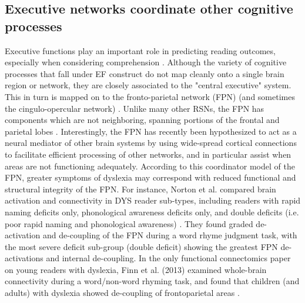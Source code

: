 \subsection{Executive networks coordinate other cognitive processes} 
Executive functions play an important role in predicting reading outcomes, especially when considering comprehension \cite{Cutting2008}. Although the variety of cognitive processes that fall under EF construct do not map cleanly onto a single brain region or network, they are closely associated to the "central executive" system. This in turn is mapped on to the fronto-parietal network (FPN) (and sometimes the cingulo-opercular network) \cite{Fedorenko2013, Cocchi2013}. Unlike many other RSNs, the FPN has components which are not neighboring, spanning portions of the frontal and parietal lobes \cite{Yeo2011}. Interestingly, the FPN has recently been hypothesized to act as a neural mediator of other brain systems \cite{Mennon2010, Cole2014} by using wide-spread cortical connections to facilitate efficient processing of other networks, and in particular assist when areas are not functioning adequately. According to this coordinator model of the FPN, greater symptoms of dyslexia may correspond with reduced functional and structural integrity of the FPN. For instance, Norton et al. compared brain activation and connectivity in DYS reader sub-types, including readers with rapid naming deficits only, phonological awareness deficits only, and double deficits (i.e. poor rapid naming and phonological awareness) \cite{Norton2014}. They found graded de-activation and de-coupling of the FPN during a word rhyme judgment task, with the most severe deficit sub-group (double deficit) showing the greatest FPN de-activations and internal de-coupling. In the only functional connectomics paper on young readers with dyslexia, Finn et al. (2013) examined whole-brain connectivity during a word/non-word rhyming task, and found that children (and adults) with dyslexia showed de-coupling of frontoparietal areas \cite{Finn2013}. 

